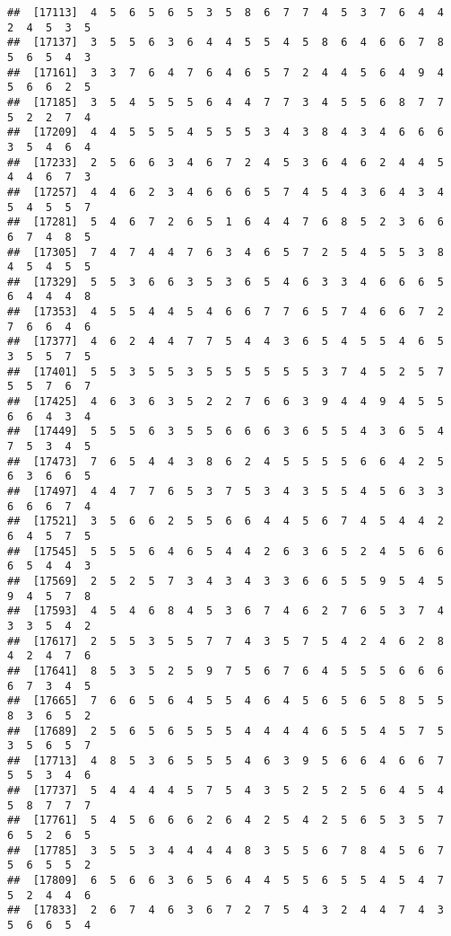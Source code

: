 \documentclass[
]{book}
\begin{document}
\begin{verbatim}
##  [17113]  4  5  6  5  6  5  3  5  8  6  7  7  4  5  3  7  6  4  4  2  4  5  3  5
##  [17137]  3  5  5  6  3  6  4  4  5  5  4  5  8  6  4  6  6  7  8  5  6  5  4  3
##  [17161]  3  3  7  6  4  7  6  4  6  5  7  2  4  4  5  6  4  9  4  5  6  6  2  5
##  [17185]  3  5  4  5  5  5  6  4  4  7  7  3  4  5  5  6  8  7  7  5  2  2  7  4
##  [17209]  4  4  5  5  5  4  5  5  5  3  4  3  8  4  3  4  6  6  6  3  5  4  6  4
##  [17233]  2  5  6  6  3  4  6  7  2  4  5  3  6  4  6  2  4  4  5  4  4  6  7  3
##  [17257]  4  4  6  2  3  4  6  6  6  5  7  4  5  4  3  6  4  3  4  5  4  5  5  7
##  [17281]  5  4  6  7  2  6  5  1  6  4  4  7  6  8  5  2  3  6  6  6  7  4  8  5
##  [17305]  7  4  7  4  4  7  6  3  4  6  5  7  2  5  4  5  5  3  8  4  5  4  5  5
##  [17329]  5  5  3  6  6  3  5  3  6  5  4  6  3  3  4  6  6  6  5  6  4  4  4  8
##  [17353]  4  5  5  4  4  5  4  6  6  7  7  6  5  7  4  6  6  7  2  7  6  6  4  6
##  [17377]  4  6  2  4  4  7  7  5  4  4  3  6  5  4  5  5  4  6  5  3  5  5  7  5
##  [17401]  5  5  3  5  5  3  5  5  5  5  5  5  3  7  4  5  2  5  7  5  5  7  6  7
##  [17425]  4  6  3  6  3  5  2  2  7  6  6  3  9  4  4  9  4  5  5  6  6  4  3  4
##  [17449]  5  5  5  6  3  5  5  6  6  6  3  6  5  5  4  3  6  5  4  7  5  3  4  5
##  [17473]  7  6  5  4  4  3  8  6  2  4  5  5  5  5  6  6  4  2  5  6  3  6  6  5
##  [17497]  4  4  7  7  6  5  3  7  5  3  4  3  5  5  4  5  6  3  3  6  6  6  7  4
##  [17521]  3  5  6  6  2  5  5  6  6  4  4  5  6  7  4  5  4  4  2  6  4  5  7  5
##  [17545]  5  5  5  6  4  6  5  4  4  2  6  3  6  5  2  4  5  6  6  6  5  4  4  3
##  [17569]  2  5  2  5  7  3  4  3  4  3  3  6  6  5  5  9  5  4  5  9  4  5  7  8
##  [17593]  4  5  4  6  8  4  5  3  6  7  4  6  2  7  6  5  3  7  4  3  3  5  4  2
##  [17617]  2  5  5  3  5  5  7  7  4  3  5  7  5  4  2  4  6  2  8  4  2  4  7  6
##  [17641]  8  5  3  5  2  5  9  7  5  6  7  6  4  5  5  5  6  6  6  6  7  3  4  5
##  [17665]  7  6  6  5  6  4  5  5  4  6  4  5  6  5  6  5  8  5  5  8  3  6  5  2
##  [17689]  2  5  6  5  6  5  5  5  4  4  4  4  6  5  5  4  5  7  5  3  5  6  5  7
##  [17713]  4  8  5  3  6  5  5  5  4  6  3  9  5  6  6  4  6  6  7  5  5  3  4  6
##  [17737]  5  4  4  4  4  5  7  5  4  3  5  2  5  2  5  6  4  5  4  5  8  7  7  7
##  [17761]  5  4  5  6  6  6  2  6  4  2  5  4  2  5  6  5  3  5  7  6  5  2  6  5
##  [17785]  3  5  5  3  4  4  4  4  8  3  5  5  6  7  8  4  5  6  7  5  6  5  5  2
##  [17809]  6  5  6  6  3  6  5  6  4  4  5  5  6  5  5  4  5  4  7  5  2  4  4  6
##  [17833]  2  6  7  4  6  3  6  7  2  7  5  4  3  2  4  4  7  4  3  5  6  6  5  4

\end{verbatim}
\end{document}
